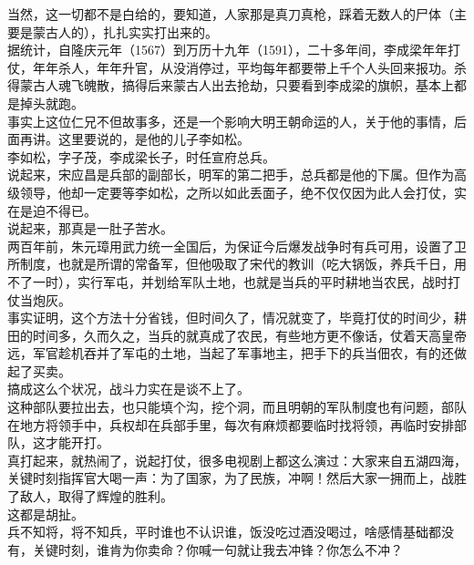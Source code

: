 \begin{multicols}{\theparacolNo}
当然，这一切都不是白给的，要知道，人家那是真刀真枪，踩着无数人的尸体（主要是蒙古人的），扎扎实实打出来的。\\

据统计，自隆庆元年（1567）到万历十九年（1591），二十多年间，李成梁年年打仗，年年杀人，年年升官，从没消停过，平均每年都要带上千个人头回来报功。杀得蒙古人魂飞魄散，搞得后来蒙古人出去抢劫，只要看到李成梁的旗帜，基本上都是掉头就跑。\\

事实上这位仁兄不但故事多，还是一个影响大明王朝命运的人，关于他的事情，后面再讲。这里要说的，是他的儿子李如松。\\

李如松，字子茂，李成梁长子，时任宣府总兵。\\

说起来，宋应昌是兵部的副部长，明军的第二把手，总兵都是他的下属。但作为高级领导，他却一定要等李如松，之所以如此丢面子，绝不仅仅因为此人会打仗，实在是迫不得已。\\

说起来，那真是一肚子苦水。\\

两百年前，朱元璋用武力统一全国后，为保证今后爆发战争时有兵可用，设置了卫所制度，也就是所谓的常备军，但他吸取了宋代的教训（吃大锅饭，养兵千日，用不了一时），实行军屯，并划给军队土地，也就是当兵的平时耕地当农民，战时打仗当炮灰。\\

事实证明，这个方法十分省钱，但时间久了，情况就变了，毕竟打仗的时间少，耕田的时间多，久而久之，当兵的就真成了农民，有些地方更不像话，仗着天高皇帝远，军官趁机吞并了军屯的土地，当起了军事地主，把手下的兵当佃农，有的还做起了买卖。\\

搞成这么个状况，战斗力实在是谈不上了。\\

这种部队要拉出去，也只能填个沟，挖个洞，而且明朝的军队制度也有问题，部队在地方将领手中，兵权却在兵部手里，每次有麻烦都要临时找将领，再临时安排部队，这才能开打。\\

真打起来，就热闹了，说起打仗，很多电视剧上都这么演过：大家来自五湖四海，关键时刻指挥官大喝一声：为了国家，为了民族，冲啊！然后大家一拥而上，战胜了敌人，取得了辉煌的胜利。\\

这都是胡扯。\\

兵不知将，将不知兵，平时谁也不认识谁，饭没吃过酒没喝过，啥感情基础都没有，关键时刻，谁肯为你卖命？你喊一句就让我去冲锋？你怎么不冲？\\


\end{multicols}
